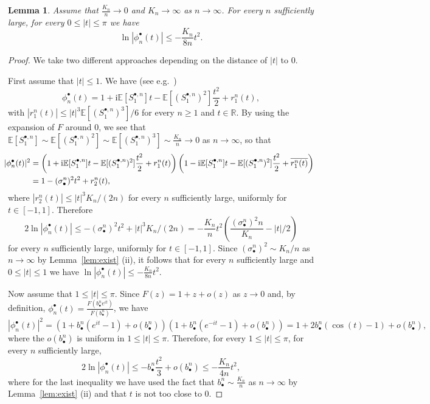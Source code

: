 \documentclass[11pt]{article}
\newtheorem{lemma}[theo]{Lemma}
\theoremstyle{definition}
\numberwithin{equation}{section}
\numberwithin{figure}{section}
\numberwithin{table}{section}
\newcommand{\E}{\mathbb{E}}
\newcommand{\R}{\mathbb{R}}
\def\bbn{b_{\bullet}^{n}}
\def\sbn{\sigma_{\bullet}^{n}}
\def\Sbn{S^{\bullet,n}}
\def\phibn{\phi^{\bullet}_{n}}
\begin{document}
\begin{lemma}\label{lem:phib}
Assume that $\tfrac{K_{n}}{n} \rightarrow 0$ and $K_{n} \rightarrow \infty$ as $n \rightarrow \infty$. For every $n$ sufficiently large, for every $ 0 \leq |t| \leq \pi$  we have
\begin{equation}
\label{eq:phib}  \ln | \phibn (t)| \leq -  \frac{K_{n}}{ 8n} t^{2}.
\end{equation}
\end{lemma}

\begin{proof}
We take two different approaches depending on the distance of $|t|$ to $0$.

First assume that $|t| \leq 1$. We have (see e.g.~\cite[Lemma 3.3.7]{Dur10})
\[\phibn(t)=1+\textrm{i}\E[\Sbn_{1}]t- \E[(\Sbn_{1})^{2}] \frac{t^{2}}{2}+r^{n}_{1}(t),\]
with $|r^{n}_{1}(t)| \leq |t|^{3} \E[(\Sbn_{1})^{3}]/6$ for every $n \geq 1$ and $t \in \R$. By using the expansion of $F$ around $0$, we see that $ \E[\Sbn_{1}] \sim \E[(\Sbn_{1})^{2}] \sim \E[(\Sbn_{1})^{3}] \sim \frac{K_{n}}{n} \rightarrow 0$ as $n \rightarrow \infty$, so that
\begin{align*}
  \hspace{ -2mm} |\phibn(t)|^{2} &= \left( 1+\textrm{i}\E[\Sbn_{1}]t- \E[(\Sbn_{1})^{2}] \frac{t^{2}}{2}+r^{n}_{1}(t) \right) \left( 1-\textrm{i}\E[\Sbn_{1}]t- \E[(\Sbn_{1})^{2}] \frac{t^{2}}{2}+\overline{r^{n}_{1}(t)} \right)\\
&= 1 - (\sbn)^{2} t^{2}+r^{n}_{2}(t),
\end{align*}
where $|r^{n}_{2}(t)| \leq  |t|^{3} K_{n}/(2n)$ for every $n$ sufficiently large, uniformly for $t \in [-1,1]$.
Therefore
\[ 2 \ln |\phibn(t)| \leq - (\sbn)^{2} t^{2}+ |t|^{3} K_{n}/(2n)= - \frac{K_{n}}{n} t^{2} \left(  \frac{(\sbn)^{2} n}{K_{n}}-|t|/2 \right)
\]
for every $n$ sufficiently large, uniformly for $t \in [-1,1]$.
Since $(\sbn)^{2} \sim K_{n}/n$ as $n \rightarrow \infty$ by Lemma~\ref{lem:exist} (ii), it follows that for every $n$ sufficiently large and $0 \leq |t| \leq 1$ we have $ \ln | \phibn (t)| \leq -  \frac{K_{n}}{ 8n} t^{2}$.

Now assume that $1 \leq |t| \leq \pi$. Since $F(z)=1+z+o(z)$ as $z \rightarrow 0$ and, by definition, $\phibn(t)=\tfrac{F( \bbn e^{it})}{F(\bbn)}$,
we have
\[|\phibn(t)|^{2}=(1+\bbn(e^{it}-1)+o(\bbn))(1+\bbn(e^{-it}-1)+o(\bbn))=1+2\bbn(\cos(t)-1)+o(\bbn),\]
where the $o(\bbn)$ is uniform in $1\leq |t| \leq \pi$.
Therefore, for every $1 \leq |t| \leq \pi$, for every $n$ sufficiently large,
\[ 2 \ln |\phibn(t)| \leq - \bbn \frac{t^{2}}{3}+o(\bbn) \leq - \frac{K_{n}}{4n} t^{2},\]
where for the last inequality we have used the fact that $\bbn \sim \frac{K_{n}}{n}$ as $n \rightarrow \infty$ by Lemma~\ref{lem:exist} (ii) and that $t$ is not too close to $0$.
\end{proof}
\end{document}
